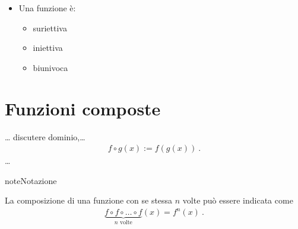 \documentclass[letterpaper,10pt,italian]{jupyterBook}
\begin{document}
\begin{itemize}
\item {} 
\sphinxAtStartPar
{} Una funzione è:
\begin{itemize}
\item {} 
\sphinxAtStartPar
suriettiva 

\item {} 
\sphinxAtStartPar
iniettiva 

\item {} 
\sphinxAtStartPar
biunivoca 

\end{itemize}

\end{itemize}


\section{Funzioni composte}
\label{\detokenize{ch/precalculus/real-functions:funzioni-composte}}\label{\detokenize{ch/precalculus/real-functions:math-hs-precalculus-real-functions-composite}}
\sphinxAtStartPar
… discutere dominio,…
\begin{equation*}
\begin{split}f \circ g (x) := f\left( g( x ) \right) \ .\end{split}
\end{equation*}
\sphinxAtStartPar
…

\begin{sphinxadmonition}{note}{Notazione}

\sphinxAtStartPar
La composizione di una funzione con se stessa \(n\) volte può essere indicata come
\begin{equation*}
\begin{split}\underbrace{f \circ f \circ \dots \circ f}_{n \text{ volte}} (x) = f^n (x) \ .\end{split}
\end{equation*}\end{sphinxadmonition}
\end{document}
